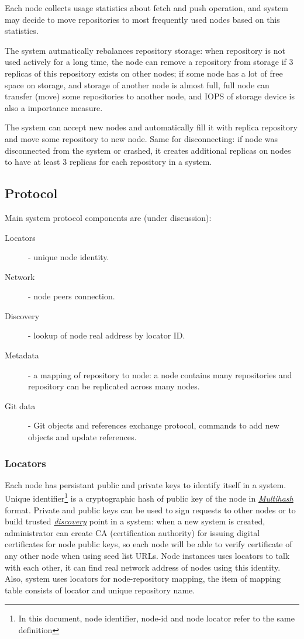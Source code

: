 \documentclass[12pt,oneside]{article}
\begin{document}
Each node collects usage statistics about fetch and push operation, and system may decide to move repositories
to most frequently used nodes based on this statistics.

The system autmatically rebalances repository storage: when repository is not used actively for a
long time, the node can remove a repository from storage if 3 replicas of this repository exists on other nodes;
if some node has a lot of free space on storage, and storage of another node is almost full,
full node can transfer (move) some repositories to another node, and IOPS of storage device is also
a importance measure.

The system can accept new nodes and automatically fill it with replica repository and
move some repository to new node. Same for disconnecting: if node was disconnected from the system or crashed,
it creates additional replicas on nodes to have at least 3 replicas for each repository in a system.

\subsection{Protocol}
Main system protocol components are (under discussion):
\begin{description}
  \item[Locators] - unique node identity.
  \item[Network] - node peers connection.
  \item[Discovery] - lookup of node real address by locator ID.
  \item[Metadata] - a mapping of repository to node: a node contains many repositories and
    repository can be replicated across many nodes.
  \item[Git data] - Git objects and references exchange protocol, commands to add new objects and update references.
\end{description}

\subsubsection{Locators}
Each node has persistant public and private keys to identify itself in a system.
Unique identifier\footnote{In this document, node identifier, node-id and node locator refer to the same definition}
is a cryptographic hash of public key of the node in \emph{\href{https://multiformats.io/multihash/}{Multihash}} format.
Private and public keys can be used to sign requests to other nodes or to build trusted \emph{\hyperref[sec:discovery]{discovery}}
point in a system: when a new system is created, administrator can create CA (certification authority) for issuing
digital certificates for node public keys, so each node will be able to verify certificate of any other node when
using seed list URLs. Node instances uses locators to talk with each other, it can find real network address of nodes using
this identity. Also, system uses locators for node-repository mapping, the item of mapping table consists of
locator and unique repository name.
\end{document}
